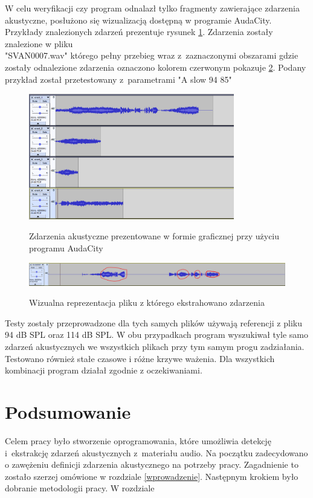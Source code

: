\documentclass[eng,printmode]{mgr}
\begin{document}
W celu weryfikacji czy program odnalazł tylko fragmenty zawierające zdarzenia akustyczne, posłużono się wizualizacją dostępną w programie AudaCity. Przykłady znalezionych zdarzeń prezentuje rysunek \ref{znalezione_zdarzenia}. Zdarzenia zostały znalezione w pliku \\"SVAN0007.wav" którego pełny przebieg wraz z~zaznaczonymi obszarami  gdzie zostały odnalezione zdarzenia oznaczono kolorem czerwonym pokazuje \ref{przebieg}. Podany przykład został przetestowany z~parametrami "A slow 94 85"

\begin{figure}[hbtp]
\caption{Zdarzenia akustyczne prezentowane w formie graficznej przy użyciu programu AudaCity}
\centering
\includegraphics[width=0.8\textwidth]{zdarzeniaAuda.PNG}
\label{znalezione_zdarzenia}
\end{figure}

\begin{figure}[hbtp]
\caption{Wizualna reprezentacja pliku z którego ekstrahowano zdarzenia}
\centering
\includegraphics[angle=90,origin=c, scale = 0.6]{oryginalAuda.PNG}
\label{przebieg}
\end{figure}

Testy zostały przeprowadzone dla tych samych plików używają referencji z pliku 94 dB SPL oraz 114 dB SPL. W obu przypadkach program wyszukiwał tyle samo zdarzeń akustycznych we wszystkich plikach przy tym samym progu zadziałania. Testowano również stałe czasowe i różne krzywe ważenia. Dla wszystkich kombinacji program działał zgodnie z oczekiwaniami. 

\chapter{Podsumowanie}
Celem pracy było stworzenie oprogramowania, które umożliwia detekcję i~ekstrakcję zdarzeń akustycznych z~materiału audio. Na początku zadecydowano o zawężeniu definicji zdarzenia akustycznego na potrzeby pracy. Zagadnienie to zostało szerzej omówione w rozdziale \ref{wprowadzenie}. 
Następnym krokiem było dobranie metodologii pracy. W rozdziale 
\appendix
{} %

\listoffigures
\lstlistoflistings
\end{document}
